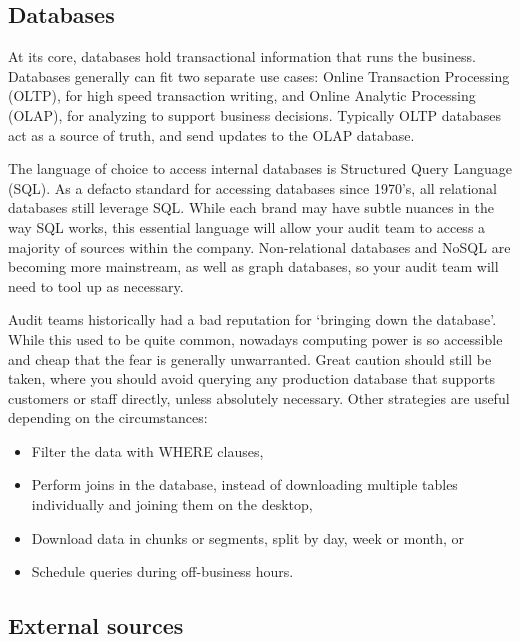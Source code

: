 \documentclass[
]{book}
\providecommand{\tightlist}{%
  \setlength{\itemsep}{0pt}\setlength{\parskip}{0pt}}
\begin{document}
\hypertarget{databases}{%
\subsection{Databases}\label{databases}}

At its core, databases hold transactional information that runs the business. Databases generally can fit two separate use cases: Online Transaction Processing (OLTP), for high speed transaction writing, and Online Analytic Processing (OLAP), for analyzing to support business decisions. Typically OLTP databases act as a source of truth, and send updates to the OLAP database.

The language of choice to access internal databases is Structured Query Language (SQL). As a defacto standard for accessing databases since 1970's, all relational databases still leverage SQL. While each brand may have subtle nuances in the way SQL works, this essential language will allow your audit team to access a majority of sources within the company. Non-relational databases and NoSQL are becoming more mainstream, as well as graph databases, so your audit team will need to tool up as necessary.

Audit teams historically had a bad reputation for `bringing down the database'. While this used to be quite common, nowadays computing power is so accessible and cheap that the fear is generally unwarranted. Great caution should still be taken, where you should avoid querying any production database that supports customers or staff directly, unless absolutely necessary. Other strategies are useful depending on the circumstances:

\begin{itemize}
\tightlist
\item
  Filter the data with WHERE clauses,
\item
  Perform joins in the database, instead of downloading multiple tables individually and joining them on the desktop,
\item
  Download data in chunks or segments, split by day, week or month, or
\item
  Schedule queries during off-business hours.
\end{itemize}

\hypertarget{external-sources}{%
\subsection{External sources}\label{external-sources}}
\end{document}
